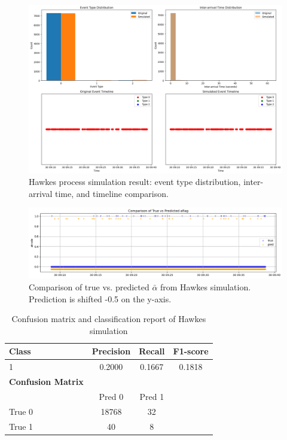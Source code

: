 \begin{figure}[H]
    \centering
    \includegraphics[width=\textwidth]{figures/hawkes_simulation.png}
    \caption{Hawkes process simulation result: event type distribution, inter-arrival time, and timeline comparison.}
    \label{fig:hawkes-simulation}
\end{figure}

\begin{figure}[H]
    \centering
    \includegraphics[width=\textwidth]{figures/hawkes_pred_vs_true.png}
    \caption{Comparison of true vs. predicted $\bar{\alpha}$ from Hawkes simulation. Prediction is shifted -0.5 on the y-axis.}
    \label{fig:hawkes-pred-vs-true}
\end{figure}

\begin{table}[H]
    \centering
    \caption{Confusion matrix and classification report of Hawkes simulation}
    \label{tab:hawkes-metrics}
    \begin{tabular}{lccc}
        \toprule
        Class & Precision & Recall & F1-score \\
        \midrule
        1 & 0.2000 & 0.1667 & 0.1818 \\
        \midrule
        \textbf{Confusion Matrix} & \multicolumn{3}{c}{} \\
        \midrule
        & Pred 0 & Pred 1 & \\
        \midrule
        True 0 & 18768 & 32 & \\
        True 1 & 40 & 8 & \\
        \bottomrule
    \end{tabular}
\end{table}

